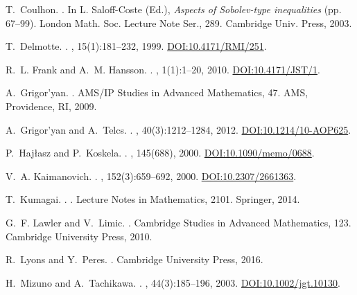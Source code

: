 \documentclass[12pt]{amsart}
\theoremstyle{definition}
\theoremstyle{remark}
\begin{document}
\begin{thebibliography}{99}
T.~Coulhon.
.
\newblock In L. Saloff-Coste (Ed.), {\em Aspects of Sobolev-type inequalities} (pp. 67--99). London Math. Soc. Lecture Note Ser., 289. Cambridge Univ. Press, 2003.

T.~Delmotte.
.
, 15(1):181--232, 1999.
\newblock \href{https://doi.org/10.4171/RMI/251}{DOI:10.4171/RMI/251}.

R.~L. Frank and A.~M. Hansson.
.
, 1(1):1--20, 2010.
\newblock \href{https://doi.org/10.4171/JST/1}{DOI:10.4171/JST/1}.

A.~Grigor'yan.
.
\newblock AMS/IP Studies in Advanced Mathematics, 47. AMS, Providence, RI, 2009.

A.~Grigor'yan and A.~Telcs.
.
, 40(3):1212--1284, 2012.
\newblock \href{https://doi.org/10.1214/10-AOP625}{DOI:10.1214/10-AOP625}.

P.~Hajłasz and P.~Koskela.
.
, 145(688), 2000.
\newblock \href{https://doi.org/10.1090/memo/0688}{DOI:10.1090/memo/0688}.

V.~A. Kaimanovich.
.
, 152(3):659--692, 2000.
\newblock \href{https://doi.org/10.2307/2661363}{DOI:10.2307/2661363}.

T.~Kumagai.
.
. Lecture Notes in Mathematics, 2101. Springer, 2014.

G.~F. Lawler and V.~Limic.
.
\newblock Cambridge Studies in Advanced Mathematics, 123. Cambridge University Press, 2010.

R.~Lyons and Y.~Peres.
.
\newblock Cambridge University Press, 2016.

H.~Mizuno and A.~Tachikawa.
.
, 44(3):185--196, 2003.
\newblock \href{https://doi.org/10.1002/jgt.10130}{DOI:10.1002/jgt.10130}.

\end{thebibliography}
\end{document}
